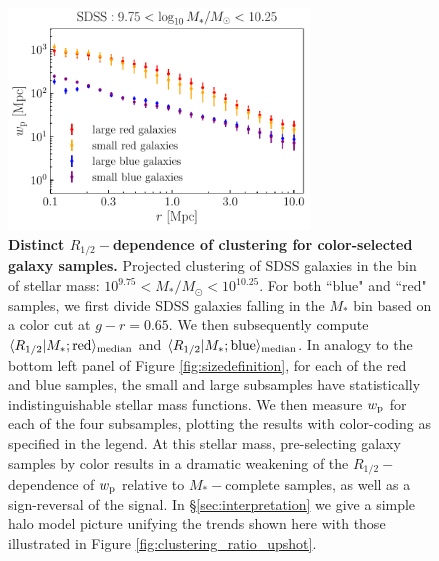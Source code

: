 \documentclass[usenatbib,usegraphicx,letterpaper]{mn2e}
\newcommand{\rhalf}{R_{1/2}}
\newcommand{\mstar}{M_{\ast}}
\newcommand{\wproj}{w_{\rm p}}
\newcommand{\median}[2]{\langle{#1}\vert{#2}\rangle_{\rm median}}
\newcommand{\msun}{M_\odot}
\begin{document}
\begin{figure}
\centering
\includegraphics[width=8cm]{FIGS/color_selected_size_dependent_clustering.pdf}
\caption{
{\bf Distinct $\rhalf-$dependence of clustering for color-selected galaxy samples.}
Projected clustering of SDSS galaxies in the bin of stellar mass: $10^{9.75}<\mstar/\msun<10^{10.25}.$ For both ``blue" and ``red" samples, we first divide SDSS galaxies falling in the $\mstar$ bin based on a color cut at $g-r=0.65.$ We then subsequently compute $\median{\rhalf}{\mstar; {\rm red}}$ and $\median{\rhalf}{\mstar; {\rm blue}}$. In analogy to the bottom left panel of Figure \ref{fig:sizedefinition}, for each of the red and blue samples, the small and large subsamples have statistically indistinguishable stellar mass functions. We then measure $\wproj$ for each of the four subsamples, plotting the results with color-coding as specified in the legend. At this stellar mass, pre-selecting galaxy samples by color results in a dramatic weakening of the $\rhalf-$dependence of $\wproj$ relative to $\mstar-$complete samples, as well as a sign-reversal of the signal. In \S\ref{sec:interpretation} we give a simple halo model picture unifying the trends shown here with those illustrated in Figure \ref{fig:clustering_ratio_upshot}.
}
\label{fig:colorclustering}
\end{figure}
\end{document}
